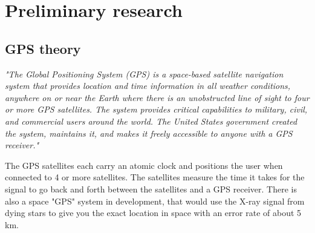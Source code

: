 \clearpage
\section{Preliminary research}














\subsection{GPS theory}

\textit{"The Global Positioning System (GPS) is a space-based satellite navigation system that provides location and time information in all weather conditions, anywhere on or near the Earth where there is an unobstructed line of sight to four or more GPS satellites. The system	 provides critical capabilities to military, civil, and commercial users around the world. The United States government created the system, maintains it, and makes it freely accessible to anyone with a GPS receiver."\cite{GPS1}}

The GPS satellites each carry an atomic clock and positions the user when connected to 4 or more satellites. The satellites measure the time it takes for the signal to go back and forth between the satellites and a GPS receiver\cite{GPS1}. There is also a space "GPS" system in development, that would use the X-ray signal from dying stars to give you the exact location in space with an error rate of about 5 km\cite{GPS2}.

